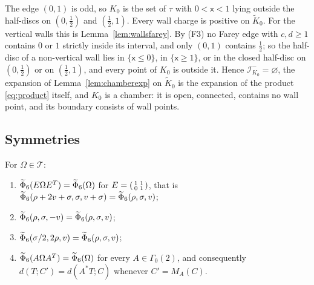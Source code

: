The edge $(0,1)$ is odd, so $K_0$ is the set of $\tau$ with $0<\mathsf x<1$ lying outside the half-discs on $(0,\frac12)$ and $(\frac12,1)$. Every wall charge is positive on $\tilde K_0$. For the vertical walls this is Lemma~\ref{lem:wallsfarey}. By (F3) no Farey edge with $c,d\ge1$ contains $0$ or $1$ strictly inside its interval, and only $(0,1)$ contains $\frac12$; so the half-disc of a non-vertical wall lies in $\{\mathsf x\le0\}$, in $\{\mathsf x\ge1\}$, or in the closed half-disc on $(0,\frac12)$ or on $(\frac12,1)$, and every point of $K_0$ is outside it. Hence $\mathcal I^-_{K_0}=\varnothing$, the expansion of Lemma~\ref{lem:chamberexp} on $\tilde K_0$ is the expansion of the product \eqref{eq:product} itself, and $K_0$ is a chamber: it is open, connected, contains no wall point, and its boundary consists of wall points.

\subsection{Symmetries}

\begin{lemma}\label{lem:symmetries}
For $\Omega\in\mathcal T$:
\begin{enumerate}
\item[(i)] $\widetilde\Phi_6(E\Omega E^T)=\widetilde\Phi_6(\Omega)$ for $E=\begin{psmallmatrix}1&1\\0&1\end{psmallmatrix}$, that is $\widetilde\Phi_6(\rho+2v+\sigma,\sigma,v+\sigma)=\widetilde\Phi_6(\rho,\sigma,v)$;
\item[(ii)] $\widetilde\Phi_6(\rho,\sigma,-v)=\widetilde\Phi_6(\rho,\sigma,v)$;
\item[(iii)] $\widetilde\Phi_6(\sigma/2,2\rho,v)=\widetilde\Phi_6(\rho,\sigma,v)$;
\item[(iv)] $\widetilde\Phi_6(A\Omega A^T)=\widetilde\Phi_6(\Omega)$ for every $A\in\Gamma_0(2)$, and consequently $d(T;C')=d(A^\ast T;C)$ whenever $C'=M_A(C)$.
\end{enumerate}
\end{lemma}

